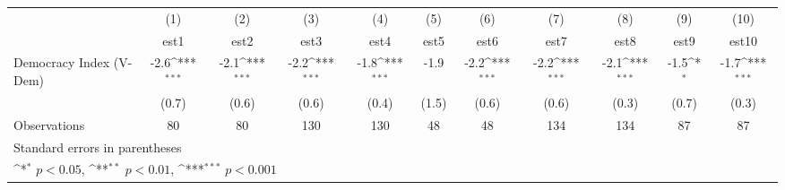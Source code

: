 {
\def\sym#1{\ifmmode^{#1}\else\(^{#1}\)\fi}
\begin{tabular}{l*{10}{c}}
\hline\hline
                    &\multicolumn{1}{c}{(1)}         &\multicolumn{1}{c}{(2)}         &\multicolumn{1}{c}{(3)}         &\multicolumn{1}{c}{(4)}         &\multicolumn{1}{c}{(5)}         &\multicolumn{1}{c}{(6)}         &\multicolumn{1}{c}{(7)}         &\multicolumn{1}{c}{(8)}         &\multicolumn{1}{c}{(9)}         &\multicolumn{1}{c}{(10)}         \\
                    &        est1         &        est2         &        est3         &        est4         &        est5         &        est6         &        est7         &        est8         &        est9         &       est10         \\
\hline
Democracy Index (V-Dem)&        -2.6\sym{***}&        -2.1\sym{***}&        -2.2\sym{***}&        -1.8\sym{***}&        -1.9         &        -2.2\sym{***}&        -2.2\sym{***}&        -2.1\sym{***}&        -1.5\sym{*}  &        -1.7\sym{***}\\
                    &       (0.7)         &       (0.6)         &       (0.6)         &       (0.4)         &       (1.5)         &       (0.6)         &       (0.6)         &       (0.3)         &       (0.7)         &       (0.3)         \\
\hline
Observations        &          80         &          80         &         130         &         130         &          48         &          48         &         134         &         134         &          87         &          87         \\
\hline\hline
\multicolumn{11}{l}{\footnotesize Standard errors in parentheses}\\
\multicolumn{11}{l}{\footnotesize \sym{*} \(p<0.05\), \sym{**} \(p<0.01\), \sym{***} \(p<0.001\)}\\
\end{tabular}
}
